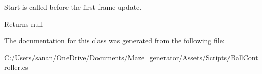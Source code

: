 Start is called before the first frame update. 

\begin{DoxyReturn}{Returns}
null 
\end{DoxyReturn}


The documentation for this class was generated from the following file\+:\begin{DoxyCompactItemize}
\item 
C\+:/\+Users/sanan/\+One\+Drive/\+Documents/\+Maze\+\_\+generator/\+Assets/\+Scripts/Ball\+Controller.\+cs\end{DoxyCompactItemize}
